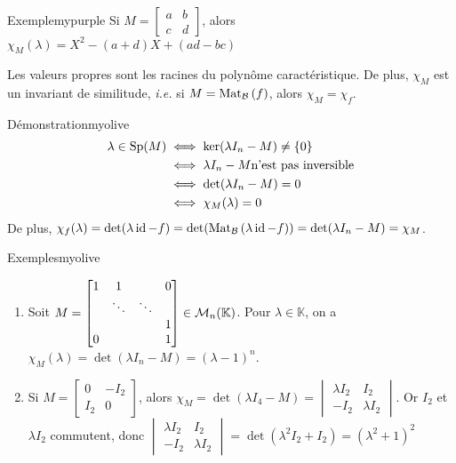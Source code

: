     \begin{omed}{Exemple}{mypurple}
        Si $M = \begin{bmatrix}
            a & b \\
            c & d
        \end{bmatrix}$, alors $\chi_M(\lambda) = X^2 - (a+d)X + (ad - bc)$
    \end{omed}

    \begin{prop}{}{}
        Les valeurs propres sont les racines du polynôme caractéristique. De plus, $\chi_M$ est un invariant de similitude, \textit{i.e.} si $M = \text{Mat}_{\mathcal{B}}\left(f\right)$, alors $\chi_M = \chi_f$.
    \end{prop}

    \begin{demo}{Démonstration}{myolive}
        \begin{align*}
            \lambda \in \operatorname{Sp}(M) 
            &\iff \ker(\lambda I_n - M) \neq \left\{0\right\} \\
            &\iff \lambda I_n - M \text{n’est pas inversible} \\
            &\iff \operatorname{det}(\lambda I_n - M) = 0 \\
            &\iff \chi_M(\lambda) = 0
        \end{align*}
        De plus, $\chi_f(\lambda) = \operatorname{det}(\lambda \operatorname{id} -f) = \operatorname{det}(\text{Mat}_{\mathcal{B}}\left(\lambda \operatorname{id} - f\right)) = \operatorname{det}(\lambda I_n - M) = \chi_M$.
    \end{demo}

    \begin{omed}{Exemples}{myolive}
        \begin{enumerate}[label=\arabic*]
            \item  Soit $M = \begin{bmatrix}
                1 & 1 & & 0 \\
                 & \ddots & \ddots & \\
                 & & & 1 \\
                0 & & & 1
            \end{bmatrix} \in \mathcal{M}_{n}(\mathbb{K})$. Pour $\lambda \in \mathbb{K}$, on a $\chi_M(\lambda) = \det(\lambda I_n - M) = (\lambda - 1)^n$.
            \item Si $M = \begin{bmatrix}
                0 & -I_2 \\
                I_2 & 0
            \end{bmatrix}$, alors $\chi_M = \det(\lambda I_4 - M) = \begin{vmatrix}
                \lambda I_2 & I_2 \\
                - I_2 & \lambda I_2
            \end{vmatrix}$. Or $I_2$ et $\lambda I_2$ commutent, donc $\begin{vmatrix}
                \lambda I_2 & I_2 \\
                - I_2 & \lambda I_2
            \end{vmatrix} = \det(\lambda^2 I_2 + I_2) = \left(\lambda^2 + 1\right)^2$
        \end{enumerate}
    \end{omed}


